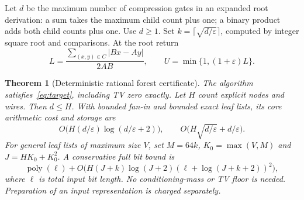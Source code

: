 \documentclass[11pt]{article}
\newtheorem{theorem}{Theorem}
\begin{document}
Let $d$ be the maximum number of compression gates in an expanded root
derivation: a sum takes the maximum child count plus one; a binary product
adds both child counts plus one. Use $d\geq1$. Set
$k=\lceil\sqrt{d/\varepsilon}\rceil$, computed by integer square root and
comparisons. At the root return
\begin{equation}\label{eq:certificate}
 L=\frac{\sum_{(x,y)\in C}|Bx-Ay|}{2AB},
 \qquad U=\min\{1,(1+\varepsilon)L\}.
\end{equation}

\begin{theorem}[Deterministic rational forest certificate]\label{thm:forest}
The algorithm satisfies~\eqref{eq:target}, including TV zero exactly.
Let $H$ count explicit nodes and wires. Then $d\leq H$. With bounded fan-in
and bounded exact leaf lists, its core arithmetic cost and storage are
\[
 O\bigl(H(d/\varepsilon)\log(d/\varepsilon+2)\bigr),\qquad
 O\bigl(H\sqrt{d/\varepsilon}+d/\varepsilon\bigr).
\]
For general leaf lists of maximum size $V$, set
$M=64k$, $K_0=\max(V,M)$ and $J=HK_0+K_0^2$.
A conservative full bit bound is
\[
 \operatorname{poly}(\ell)+
 O\bigl(H(J+k)\log(J+2)(\ell+\log(J+k+2))^2\bigr),
\]
where $\ell$ is total input bit length. No conditioning-mass or TV floor is
needed. Preparation of an input representation is charged separately.
\end{theorem}
\end{document}
